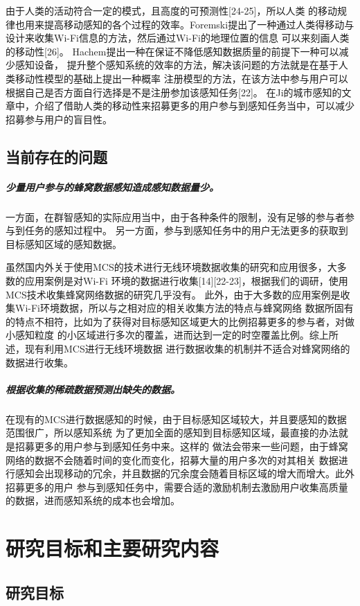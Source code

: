 \documentclass[UTF8]{ctexart}
\begin{document}
由于人类的活动符合一定的模式，且高度的可预测性[24-25]，所以人类
的移动规律也用来提高移动感知的各个过程的效率。Foremski提出了一种通过人类得移动与设计来收集Wi-Fi信息的方法，然后通过Wi-Fi的地理位置的信息
可以来刻画人类的移动性[26]。
Hachem提出一种在保证不降低感知数据质量的前提下一种可以减少感知设备，
提升整个感知系统的效率的方法，解决该问题的方法就是在基于人类移动性模型的基础上提出一种概率
注册模型的方法，在该方法中参与用户可以根据自己是否方面自行选择是不是注册参加该感知任务[22]。
在Ji的城市感知的文章中，介绍了借助人类的移动性来招募更多的用户参与到感知任务当中，可以减少
招募参与用户的盲目性。

\subsection{当前存在的问题}
\subparagraph{少量用户参与的蜂窝数据感知造成感知数据量少。}
一方面，在群智感知的实际应用当中，由于各种条件的限制，没有足够的参与者参与到任务的感知过程中。
另一方面，参与到感知任务中的用户无法更多的获取到目标感知区域的感知数据。

虽然国内外关于使用MCS的技术进行无线环境数据收集的研究和应用很多，大多数的应用案例是对Wi-Fi
环境的数据进行收集[14][22-23]，根据我们的调研，使用MCS技术收集蜂窝网络数据的研究几乎没有。
此外，由于大多数的应用案例是收集Wi-Fi环境数据，所以与之相对应的相关收集方法的特点与蜂窝网络
数据所固有的特点不相符，比如为了获得对目标感知区域更大的比例招募更多的参与者，对做小感知粒度
的小区域进行多次的覆盖，进而达到一定的时空覆盖比例。综上所述，现有利用MCS进行无线环境数据
进行数据收集的机制并不适合对蜂窝网络的数据进行收集。

\subparagraph{根据收集的稀疏数据预测出缺失的数据。}
在现有的MCS进行数据感知的时候，由于目标感知区域较大，并且要感知的数据范围很广，所以感知系统
为了更加全面的感知到目标感知区域，最直接的办法就是招募更多的用户参与到感知任务中来。这样的
做法会带来一些问题，由于蜂窝网络的数据不会随着时间的变化而变化，招募大量的用户多次的对其相关
数据进行感知会出现移动的冗余，并且数据的冗余度会随着目标区域的增大而增大。此外招募更多的用户
参与到感知任务中，需要合适的激励机制去激励用户收集高质量的数据，进而感知系统的成本也会增加。

\section{研究目标和主要研究内容}
\subsection{研究目标}
\end{document}
